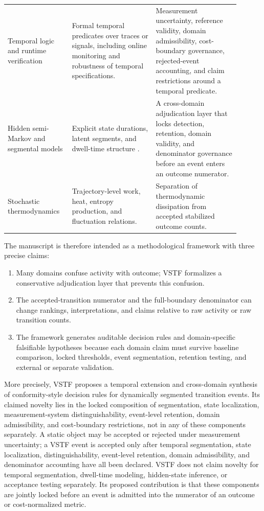 \documentclass[11pt,a4paper]{article}
\newcommand{\1}{\mathbf{1}}
\begin{document}
\begin{table}[h]
\begin{tabular}{p{0.24\linewidth}p{0.33\linewidth}p{0.33\linewidth}}
Temporal logic and runtime verification & Formal temporal predicates over traces or signals, including online monitoring and robustness of temporal specifications. & Measurement uncertainty, reference validity, domain admissibility, cost-boundary governance, rejected-event accounting, and claim restrictions around a temporal predicate. \\
Hidden semi-Markov and segmental models & Explicit state durations, latent segments, and dwell-time structure \cite{yu2010hsmm}. & A cross-domain adjudication layer that locks detection, retention, domain validity, and denominator governance before an event enters an outcome numerator. \\
Stochastic thermodynamics & Trajectory-level work, heat, entropy production, and fluctuation relations. & Separation of thermodynamic dissipation from accepted stabilized outcome counts. \\
\bottomrule
\end{tabular}
\end{table}

The manuscript is therefore intended as a methodological framework with three precise claims:

\begin{enumerate}
  \item Many domains confuse activity with outcome; VSTF formalizes a conservative adjudication layer that prevents this confusion.
  \item The accepted-transition numerator and the full-boundary denominator can change rankings, interpretations, and claims relative to raw activity or raw transition counts.
  \item The framework generates auditable decision rules and domain-specific falsifiable hypotheses because each domain claim must survive baseline comparison, locked thresholds, event segmentation, retention testing, and external or separate validation.
\end{enumerate}

More precisely, VSTF proposes a temporal extension and cross-domain synthesis of conformity-style decision rules for dynamically segmented transition events. Its claimed novelty lies in the locked composition of segmentation, state localization, measurement-system distinguishability, event-level retention, domain admissibility, and cost-boundary restrictions, not in any of these components separately. A static object may be accepted or rejected under measurement uncertainty; a VSTF event is accepted only after temporal segmentation, state localization, distinguishability, event-level retention, domain admissibility, and denominator accounting have all been declared. VSTF does not claim novelty for temporal segmentation, dwell-time modeling, hidden-state inference, or acceptance testing separately. Its proposed contribution is that these components are jointly locked before an event is admitted into the numerator of an outcome or cost-normalized metric.
\end{document}
